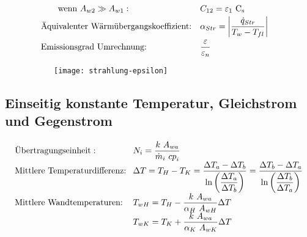 \[\begin{array}{llc}
		\text{\qquad wenn }A_{w2} \gg A_{w1}:             & C_{12} = \varepsilon_1\ \Cs                                                                                                                                                                         &                                                                         \\
		\text{Äquivalenter Wärmübergangskoeffizient:}     & \alpha_{Str} = \abs{\dfrac{{\dot{q}}_{Str}}{T_w - T_{fl}}}                                                                                                                                          &                                                                         \\
		\text{Emissionsgrad Umrechnung:}                  & \dfrac{\varepsilon}{\varepsilon_n}                                                                                                                                                                  &
	\end{array} \]
\begin{figure}[h!b]
	\raggedright
	\begin{subfigure}{6cm}
		\centering
		\texttt{[image: strahlung-epsilon]}
	\end{subfigure}
\end{figure}


\subsection{Einseitig konstante Temperatur, Gleichstrom und Gegenstrom}
	\setlength{\abovedisplayskip}{-15pt}
	\[ \arraycolsep=0.4em  \def\arraystretch{1.7}
	\begin{array}{ll}
		\text{Übertragungseinheit}:          & N_i  =  \dfrac{k\ A_{wa}}{{\dot{m}}_i\ {cp}_i}                                                                                                                                                   \\
		\text{Mittlere Temperaturdifferenz:} & \Delta T  =  T_H - T_K  =  \dfrac{\Delta T_a - \Delta T_b} {\ln\left( \dfrac{\Delta T_a}{\Delta T_b}\right)} = \dfrac{\Delta T_b - \Delta T_a} {\ln\left( \dfrac{\Delta T_b}{\Delta T_a}\right)} \\
		\text{Mittlere Wandtemperaturen:}    & T_{wH}  =  T_H - \dfrac{k\ A_{wa}}{\alpha_H\ A_{wH}} \Delta T                                                                                                                                    \\
		                                     & T_{wK}  =  T_K + \dfrac{k\ A_{wa}}{\alpha_K\ A_{wK}} \Delta T
	\end{array} \]

